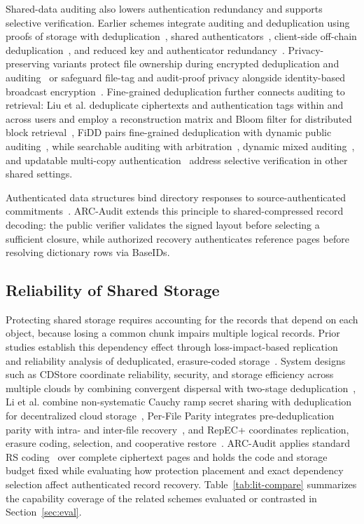 \documentclass[10pt,journal]{IEEEtran}
\begin{document}
Shared-data auditing also lowers authentication redundancy and supports selective verification. Earlier schemes integrate auditing and deduplication using proofs of storage with deduplication~\cite{Zheng2012POSD}, shared authenticators~\cite{Tian2022SharedAudit}, client-side off-chain deduplication~\cite{Zhang2023BlockchainAudit}, and reduced key and authenticator redundancy~\cite{Miao2024SharedAudit}. Privacy-preserving variants protect file ownership during encrypted deduplication and auditing~\cite{Song2023EncryptedAudit} or safeguard file-tag and audit-proof privacy alongside identity-based broadcast encryption~\cite{Zhang2025PrivacyAudit}. Fine-grained deduplication further connects auditing to retrieval: Liu et al. deduplicate ciphertexts and authentication tags within and across users and employ a reconstruction matrix and Bloom filter for distributed block retrieval~\cite{Liu2025FineGrained}, FiDD pairs fine-grained deduplication with dynamic public auditing~\cite{Huang2026FiDD}, while searchable auditing with arbitration~\cite{Miao2025}, dynamic mixed auditing~\cite{Pan2026}, and updatable multi-copy authentication~\cite{Xu2026MPA} address selective verification in other shared settings.

Authenticated data structures bind directory responses to source-authenticated commitments~\cite{Goodrich2003ADS}. ARC-Audit extends this principle to shared-compressed record decoding: the public verifier validates the signed layout before selecting a sufficient closure, while authorized recovery authenticates reference pages before resolving dictionary rows via BaseIDs.

\subsection{Reliability of Shared Storage}
Protecting shared storage requires accounting for the records that depend on each object, because losing a common chunk impairs multiple logical records. Prior studies establish this dependency effect through loss-impact-based replication~\cite{Bhagwat2006Reliability} and reliability analysis of deduplicated, erasure-coded storage~\cite{Li2010Reliability}. System designs such as CDStore coordinate reliability, security, and storage efficiency across multiple clouds by combining convergent dispersal with two-stage deduplication~\cite{Li2015CDStore}, Li et al. combine non-systematic Cauchy ramp secret sharing with deduplication for decentralized cloud storage~\cite{Li2024TNSE}, Per-File Parity integrates pre-deduplication parity with intra- and inter-file recovery~\cite{Wu2019PFP}, and RepEC+ coordinates replication, erasure coding, selection, and cooperative restore~\cite{Zuo2022RepECPlus}. ARC-Audit applies standard RS coding~\cite{ReedSolomon1960} over complete ciphertext pages and holds the code and storage budget fixed while evaluating how protection placement and exact dependency selection affect authenticated record recovery. Table~\ref{tab:lit-compare} summarizes the capability coverage of the related schemes evaluated or contrasted in Section~\ref{sec:eval}.
\end{document}
